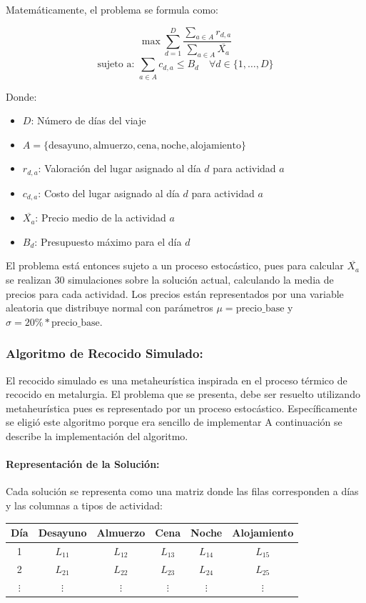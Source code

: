 \documentclass[10pt]{llncs}
\begin{document}
Matemáticamente, el problema se formula como:

\[
\max \sum_{d=1}^{D} \dfrac{\sum_{a \in A} r_{d,a}}{\sum_{a \in A}\overline{X_a} }
\]
\[
\text{sujeto a: }
\sum_{a \in A} c_{d,a} \leq B_d \quad \forall d \in \{1,\dots,D\}
\]

Donde:
\begin{itemize}
    \item $D$: Número de días del viaje
    \item $A = \{\text{desayuno}, \text{almuerzo}, \text{cena}, \text{noche}, \text{alojamiento}\}$
    \item $r_{d,a}$: Valoración del lugar asignado al día $d$ para actividad $a$
    \item $c_{d,a}$: Costo del lugar asignado al día $d$ para actividad $a$
    \item $\overline{X_a}$: Precio medio de la actividad $a$
    \item $B_d$: Presupuesto máximo para el día $d$
\end{itemize}

El problema está entonces sujeto a un proceso estocástico, pues para calcular $\overline{X_a}$ se realizan 30 simulaciones 
sobre la solución actual, calculando la media de precios para cada actividad. Los precios están representados por una variable aleatoria 
que distribuye normal con parámetros $\mu = \text{precio\_base}$ y $\sigma = 20\% * \text{precio\_base}$.

\subsubsection{Algoritmo de Recocido Simulado:}
El recocido simulado es una metaheurística inspirada en el proceso térmico de recocido en metalurgia. El problema que se presenta, debe ser resuelto utilizando 
metaheurística pues es representado por un proceso estocástico. Específicamente se eligió este algoritmo porque era sencillo de implementar
A continuación se describe la implementación del algoritmo.

\paragraph{Representación de la Solución:}
Cada solución se representa como una matriz donde las filas corresponden a días y las columnas a tipos de actividad:

\begin{center}
\begin{tabular}{c|c|c|c|c|c}
Día & Desayuno & Almuerzo & Cena & Noche & Alojamiento \\
\midrule
1 & $L_{11}$ & $L_{12}$ & $L_{13}$ & $L_{14}$ & $L_{15}$ \\
2 & $L_{21}$ & $L_{22}$ & $L_{23}$ & $L_{24}$ & $L_{25}$ \\
$\vdots$ & $\vdots$ & $\vdots$ & $\vdots$ & $\vdots$ & $\vdots$ \\
\end{tabular}
\end{center}
\end{document}
